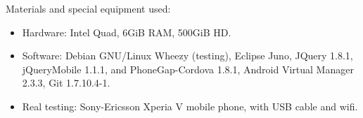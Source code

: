 Materials and special equipment used:
\begin{itemize}
  \item {Hardware: } Intel Quad, 6GiB RAM, 500GiB HD. 
  \item {Software: } Debian GNU/Linux Wheezy (testing), Eclipse Juno, JQuery 1.8.1, jQueryMobile 1.1.1, and PhoneGap-Cordova 1.8.1, Android Virtual Manager 2.3.3, Git 1.7.10.4-1.
\item { Real testing: } Sony-Ericsson Xperia V mobile phone, with USB cable and wifi.
\end{itemize}

    
    
